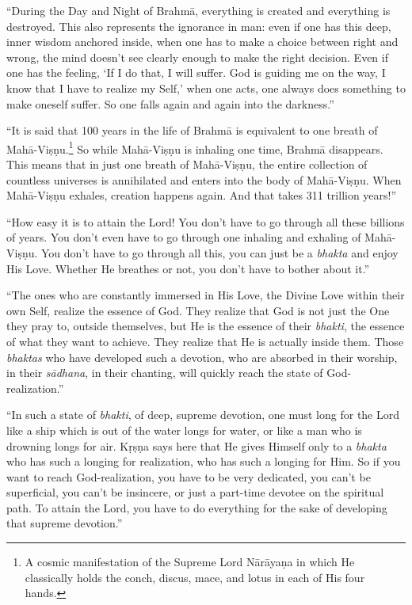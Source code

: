 \enquote{During the Day and Night of Brahmā, everything is created and everything is destroyed. This also represents the ignorance in man: even if one has this deep, inner wisdom anchored inside, when one has to make a choice between right and wrong, the mind doesn’t see clearly enough to make the right decision. Even if one has the feeling, \enquote{If I do that, I will suffer. God is guiding me on the way, I know that I have to realize my Self,} when one acts, one always does something to make oneself suffer. So one falls again and again into the darkness.}

\enquote{It is said that 100 years in the life of Brahmā is equivalent to one breath of Mahā-Viṣṇu.\footnote{A cosmic manifestation of the Supreme Lord Nārāyaṇa in which He classically holds the conch, discus, mace, and lotus in each of His four hands.} So while Mahā-Viṣṇu is inhaling one time, Brahmā disappears. This means that in just one breath of Mahā-Viṣṇu, the entire collection of countless universes is annihilated and enters into the body of Mahā-Viṣṇu. When Mahā-Viṣṇu exhales, creation happens again. And that takes 311 trillion years!}

\enquote{How easy it is to attain the Lord! You don’t have to go through all these billions of years. You don’t even have to go through one inhaling and exhaling of Mahā-Viṣṇu. You don’t have to go through all this, you can just be a \textit{bhakta} and enjoy His Love. Whether He breathes or not, you don’t have to bother about it.}

\enquote{The ones who are constantly immersed in His Love, the Divine Love within their own Self, realize the essence of God. They realize that God is not just the One they pray to, outside themselves, but He is the essence of their \textit{bhakti}, the essence of what they want to achieve. They realize that He is actually inside them. Those \textit{bhaktas} who have developed such a devotion, who are absorbed in their worship, in their \textit{sādhana}, in their chanting, will quickly reach the state of God-realization.}

\enquote{In such a state of \textit{bhakti}, of deep, supreme devotion, one must long for the Lord like a ship which is out of the water longs for water, or like a man who is drowning longs for air. Kṛṣṇa says here that He gives Himself only to a \textit{bhakta} who has such a longing for realization, who has such a longing for Him. So if you want to reach God-realization, you have to be very dedicated, you can’t be superficial, you can’t be insincere, or just a part-time devotee on the spiritual path. To attain the Lord, you have to do everything for the sake of developing that supreme devotion.}

